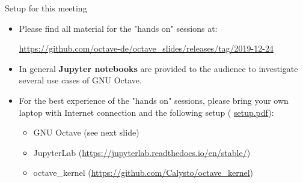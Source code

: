 \begin{frame}{Setup for this meeting}
\begin{itemize}
\itemsep1em
\item
Please find all material for the "hands on" sessions at:

{\color{DarkBlue}
\url{https://github.com/octave-de/octave_slides/releases/tag/2019-12-24}
}

\item
In general \textbf{Jupyter notebooks} are provided to the audience
to investigate several use cases of GNU Octave.

\item
For the best experience of the "hands on" sessions,
please bring your own laptop with Internet connection and the following setup
({\color{red}
\href{https://github.com/octave-de/octave_slides/releases/tag/2019-12-24/setup.pdf}{setup.pdf}}):

\begin{itemize}
\itemsep1em
\item
GNU Octave (see next slide)
\item
JupyterLab
({\color{DarkBlue}\url{https://jupyterlab.readthedocs.io/en/stable/}})
\item
octave\_kernel
({\color{DarkBlue}\url{https://github.com/Calysto/octave_kernel}})
\end{itemize}
\end{itemize}
\end{frame}


